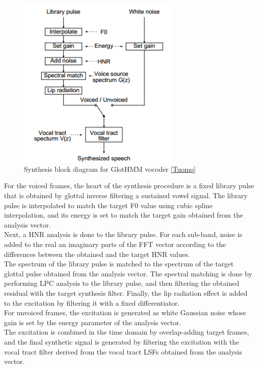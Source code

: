 \begin{figure}[!htb]
	\begin{center}
	\includegraphics[width=0.7\textwidth]{img/gsynb.png}
	\end{center}
	\caption{\label{gsynb}Synthesis block diagram for GlotHMM vocoder \ref{Tuomo}}
\end{figure}
For the voiced frames, the heart of the synthesis procedure is a fixed library pulse that is obtained by glottal inverse filtering a sustained vowel signal. The library pulse is interpolated to match the target F0 value using cubic spline interpolation, and its energy is set to match the target gain obtained from the analysis vector.\\
Next, a HNR analysis is done to the library pulse. For each sub-band, noise is added to the real an imaginary parts of the FFT vector according to the differences between the obtained and the target HNR values.\\
The spectrum of the library pulse is matched to the spectrum of the target glottal pulse obtained from the analysis vector. The spectral matching is done by performing LPC analysis to the library pulse, and then filtering the obtained residual with the target synthesis filter. Finally, the lip radiation effect is added to the excitation by filtering it with a fixed differentiator.\\
For unvoiced frames, the excitation is generated as white Gaussian noise whose gain is set by the energy parameter of the analysis vector.\\
The excitation is combined in the time domain by overlap-adding target frames, and the final synthetic signal is generated by filtering the excitation with the vocal tract filter derived from the vocal tract LSFs obtained from the analysis vector.\\
